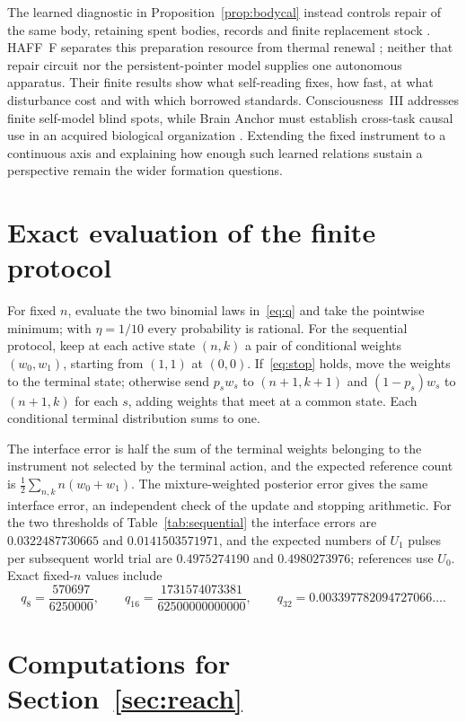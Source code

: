 \documentclass[11pt,a4paper]{article}
\begin{document}
The learned diagnostic in Proposition~\ref{prop:bodycal} instead controls
repair of the same body, retaining spent bodies, records and finite
replacement stock \cite{HAFFC}. HAFF~F separates this preparation
resource from thermal renewal \cite{HAFFF}; neither that repair circuit
nor the persistent-pointer model supplies one autonomous apparatus.
Their finite results show what self-reading fixes, how fast, at what
disturbance cost and with which borrowed standards.
Consciousness~III addresses finite self-model blind spots, while
Brain Anchor must establish cross-task causal use in an acquired
biological organization \cite{CIII,BrainAnchor}. Extending the fixed
instrument to a continuous axis and explaining how enough such learned
relations sustain a perspective remain the wider formation questions.

\appendix
\section{Exact evaluation of the finite protocol}\label{app:exact}

For fixed $n$, evaluate the two binomial laws in~\eqref{eq:q} and take the pointwise minimum; with $\eta=1/10$ every probability is rational. For the sequential protocol, keep at each active state $(n,k)$ a pair of conditional weights $(w_0,w_1)$, starting from $(1,1)$ at $(0,0)$. If~\eqref{eq:stop} holds, move the weights to the terminal state; otherwise send $p_sw_s$ to $(n+1,k+1)$ and $(1-p_s)w_s$ to $(n+1,k)$ for each $s$, adding weights that meet at a common state. Each conditional terminal distribution sums to one.

The interface error is half the sum of the terminal weights belonging to the instrument not selected by the terminal action, and the expected reference count is $\frac12\sum_{n,k}n(w_0+w_1)$. The mixture-weighted posterior error gives the same interface error, an independent check of the update and stopping arithmetic. For the two thresholds of Table~\ref{tab:sequential} the interface errors are $0.0322487730665$ and $0.0141503571971$, and the expected numbers of $U_1$ pulses per subsequent world trial are $0.4975274190$ and $0.4980273976$; references use $U_0$. Exact fixed-$n$ values include
\[
 q_8=\frac{570697}{6250000},\qquad
 q_{16}=\frac{1731574073381}{62500000000000},\qquad
 q_{32}=0.003397782094727066\ldots.
\]

\section{Computations for Section~\ref{sec:reach}}\label{app:numerics}
\end{document}
